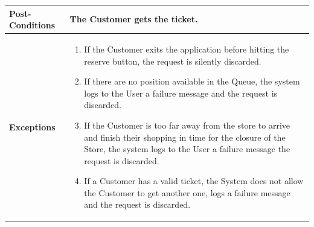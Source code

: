 \documentclass[a4paper, 10pt, oneside]{article}
\begin{document}
\begin{tabularx}{\linewidth}{| l | X |}
	\hline
	\textbf{Post-Conditions} & The Customer gets the ticket.\\
	
	\hline
	\textbf{Exceptions} & \parbox{0.7\textwidth}{ \begin{enumerate}
			\item If the Customer exits the application before hitting the reserve button, the request is silently discarded.
			\item If there are no position available in the Queue, the system logs to the User a failure message and the request is discarded.
			\item If the Customer is too far away from the store to arrive and finish their shopping in time for the closure of the Store, the system logs to the User a failure message the request is discarded.
			\item If a Customer has a valid ticket, the System does not allow the Customer to get another one, logs a failure message and the request is discarded.
		\end{enumerate}}\\

	\hline
	
\end{tabularx}
\end{document}
